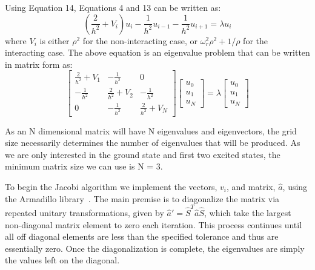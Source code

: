\documentclass[prc,amsmath,twocolumn,superscriptaddress]{revtex4}
\begin{document}
Using Equation 14, Equations 4 and 13 can be written as:
\begin{equation}
\left(\frac{2}{h^2}+V_i\right)u_i-\frac{1}{h^2}u_{i-1}-\frac{1}{h^2}u_{i+1}=\lambda u_i
\end{equation}
where $V_i$ is either $\rho^2$ for the non-interacting case, or $\omega_r^2\rho^2+1/\rho$ for the interacting case. The above equation is an eigenvalue problem that can be written in matrix form as:
\begin{equation}
\begin{bmatrix} \frac{2}{h^2}+V_1 & -\frac{1}{h^2} &0 \\ -\frac{1}{h^2}  & \frac{2}{h^2}+V_2 &-\frac{1}{h^2} \\ 0  & -\frac{1}{h^2}  &\frac{2}{h^2}+V_N \end{bmatrix}
\begin{bmatrix} u_0  \\ u_1\\ u_N \end{bmatrix}=\lambda \begin{bmatrix} u_0  \\ u_1\\ u_N \end{bmatrix}
\label{matrix}
\end{equation}

As an N dimensional matrix will have N eigenvalues and eigenvectors, the grid size necessarily determines the number of eigenvalues that will be produced. As we are only interested in the ground state and first two excited states, the minimum matrix size we can use is N = 3.

To begin the Jacobi algorithm we implement the vectors, $v_i$, and matrix, $\hat{a}$, using the Armadillo library~\cite{armadillo}. The main premise is to diagonalize the matrix via repeated unitary transformations, given by $\hat{a}'=\hat{S}^T\hat{a}\hat{S}$, which take the largest non-diagonal matrix element to zero each iteration. This process continues until all off diagonal elements are less than the specified tolerance and thus are essentially zero. Once the diagonalization is complete, the eigenvalues are simply the values left on the diagonal.
\end{document}
